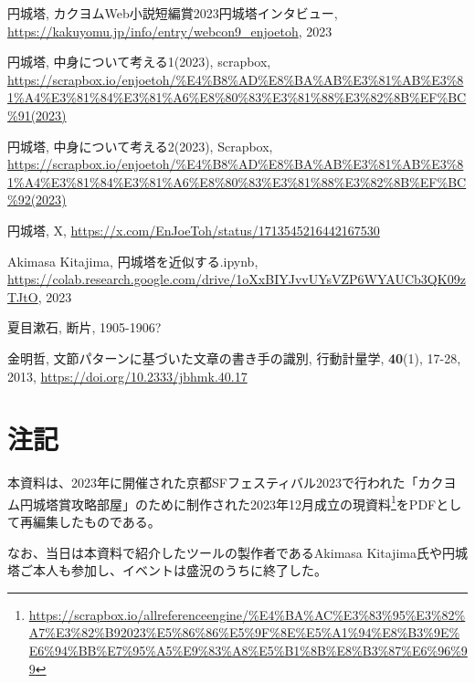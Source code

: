 \documentclass[10pt, a5paper, twoside]{jsarticle}
\theoremstyle{definition}
\begin{document}
	\begin{thebibliography}{99}

		 円城塔, カクヨムWeb小説短編賞2023円城塔インタビュー, \url{https://kakuyomu.jp/info/entry/webcon9_enjoetoh}, 2023

		 円城塔, 中身について考える1(2023), scrapbox, \url{https://scrapbox.io/enjoetoh/%E4%B8%AD%E8%BA%AB%E3%81%AB%E3%81%A4%E3%81%84%E3%81%A6%E8%80%83%E3%81%88%E3%82%8B%EF%BC%91(2023)}

		 円城塔, 中身について考える2(2023), Scrapbox, \url{https://scrapbox.io/enjoetoh/%E4%B8%AD%E8%BA%AB%E3%81%AB%E3%81%A4%E3%81%84%E3%81%A6%E8%80%83%E3%81%88%E3%82%8B%EF%BC%92(2023)}

		 円城塔, X, \url{https://x.com/EnJoeToh/status/1713545216442167530}

		 Akimasa Kitajima, 円城塔を近似する.ipynb, \url{https://colab.research.google.com/drive/1oXxBIYJvvUYsVZP6WYAUCb3QK09zTJtO}, 2023

		 夏目漱石, 断片, 1905-1906?

		 金明哲, 文節パターンに基づいた文章の書き手の識別, 行動計量学, \textbf{40}(1), 17-28, 2013, \url{https://doi.org/10.2333/jbhmk.40.17}

	\end{thebibliography}

	\section*{注記}

		本資料は、2023年に開催された京都SFフェスティバル2023で行われた「カクヨム円城塔賞攻略部屋」のために制作された2023年12月成立の現資料\footnote{\url{https://scrapbox.io/allreferenceengine/%E4%BA%AC%E3%83%95%E3%82%A7%E3%82%B92023%E5%86%86%E5%9F%8E%E5%A1%94%E8%B3%9E%E6%94%BB%E7%95%A5%E9%83%A8%E5%B1%8B%E8%B3%87%E6%96%99}}をPDFとして再編集したものである。

		なお、当日は本資料で紹介したツールの製作者であるAkimasa Kitajima氏や円城塔ご本人も参加し、イベントは盛況のうちに終了した。
\end{document}
